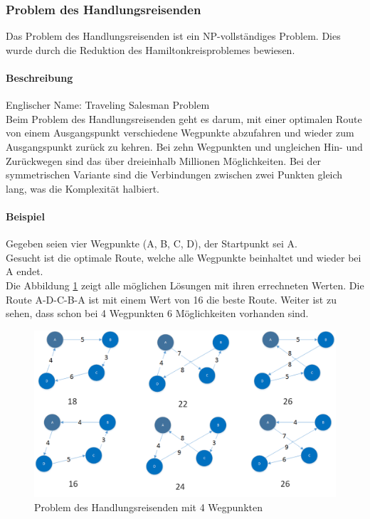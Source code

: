 	\subsubsection{Problem des Handlungsreisenden}\label{tsp}
	Das Problem des Handlungsreisenden ist ein NP-vollständiges Problem. Dies wurde durch die Reduktion des Hamiltonkreisproblemes bewiesen.

	\paragraph{Beschreibung}
	Englischer Name: Traveling Salesman Problem\\
	Beim Problem des Handlungsreisenden geht es darum, mit einer optimalen Route von einem Ausgangspunkt verschiedene Wegpunkte abzufahren und wieder zum Ausgangspunkt zurück 
	zu kehren. Bei zehn Wegpunkten und ungleichen Hin- und Zurückwegen sind das über dreieinhalb Millionen Möglichkeiten. Bei der symmetrischen Variante sind die Verbindungen 
	zwischen zwei Punkten gleich lang, was die Komplexität halbiert. 

	\paragraph{Beispiel} Gegeben seien vier Wegpunkte (A, B, C, D), der Startpunkt sei A.\\
	Gesucht ist die optimale Route, welche alle Wegpunkte beinhaltet und wieder bei A endet.\\
	Die Abbildung \ref{fig:tsp_example} zeigt alle möglichen Lösungen mit ihren errechneten Werten. Die Route A-D-C-B-A ist mit einem Wert von 16 die beste Route. Weiter ist zu sehen, 
	dass schon bei 4 Wegpunkten 6 Möglichkeiten vorhanden sind.
\begin{figure}[h]
\centering
\includegraphics[scale=0.55]{images/visio/tsp.png}
\caption[Problem des Handlungsreisenden mit 4 Wegpunkten]{Problem des Handlungsreisenden mit 4 Wegpunkten \selfmade{}}
\label{fig:tsp_example}
\end{figure}

